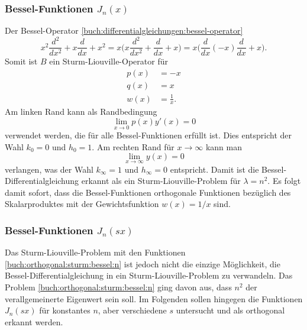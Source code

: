 %
%
\subsubsection{Bessel-Funktionen $J_n(x)$}
Der Bessel-Operator \eqref{buch:differentialgleichungen:bessel-operator}
%
\[
x^2\frac{d^2}{dx^2} + x\frac{d}{dx} + x^2
=
x\biggl(
x\frac{d^2}{dx^2} + \frac{d}{dx} + x
\biggr)
=
x\biggl(
\frac{d}{dx}(-x)\frac{d}{dx} + x
\biggr).
\]
Somit ist $B$ ein Sturm-Liouville-Operator für 
\begin{equation}
\begin{aligned}
p(x) &= -x \\
q(x) &= x \\
w(x) &= \frac{1}{x}.
\end{aligned}
\label{buch:orthogonal:sturm:bessel:n}
\end{equation}
Am linken Rand kann als Randbedingung 
\[
\lim_{x\to 0} p(x) y'(x) = 0
\]
verwendet werden, die für alle Bessel-Funktionen erfüllt ist.
Dies entspricht der Wahl $k_0=0$ und $h_0=1$.
Am rechten Rand für $x\to\infty$ kann man
\[
\lim_{x\to\infty} y(x)=0
\]
verlangen, was der Wahl $k_\infty=1$ und $h_\infty=0$ entspricht.
Damit ist die Bessel-Differentialgleichung erkannt als ein
Sturm-Liouville-Problem für $\lambda=n^2$.
Es folgt damit sofort, dass die Bessel-Funktionen orthogonale
Funktionen bezüglich des Skalarproduktes mit der Gewichtsfunktion
$w(x)=1/x$ sind.

%
%
\subsubsection{Bessel-Funktionen $J_n(s x)$}
Das Sturm-Liouville-Problem mit den Funktionen
\eqref{buch:orthogonal:sturm:bessel:n}
ist jedoch nicht die einzige Möglichkeit, die Bessel-Differentialgleichung
in ein Sturm-Liouville-Problem zu verwandeln.
Das Problem \eqref{buch:orthogonal:sturm:bessel:n} ging davon
aus, dass $n^2$ der verallgemeinerte Eigenwert sein soll.
Im Folgenden sollen hingegen die Funktionen $J_n(s x)$ für
konstantes $n$, aber verschiedene $s$ untersucht und
als orthogonal erkannt werden.

